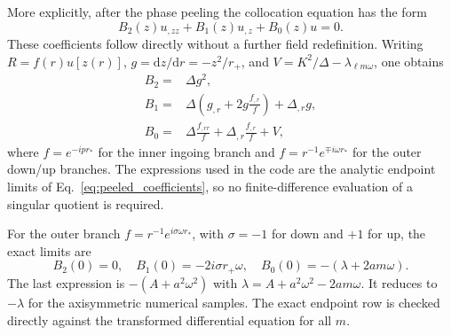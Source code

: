 \documentclass[aps,prd,twocolumn,10pt,nofootinbib,superscriptaddress,floatfix]{revtex4-2}
\newcommand{\dd}{\mathrm{d}}
\begin{document}
More explicitly, after the phase peeling the collocation equation has the
form
\begin{equation}
 B_2(z)u_{,zz}+B_1(z)u_{,z}+B_0(z)u=0 .
\label{eq:peeled_matrix_equation}
\end{equation}
These coefficients follow directly without a further field redefinition.
Writing $R=f(r)u[z(r)]$, $g=\dd z/\dd r=-z^2/r_+$, and
$V=K^2/\Delta-\lambda_{\ell m\omega}$, one obtains
\begin{align}
B_2={}&\Delta g^2,\nonumber\\
B_1={}&\Delta\left(g_{,r}+2g\frac{f_{,r}}{f}\right)
       +\Delta_{,r}g,\nonumber\\
B_0={}&\Delta\frac{f_{,rr}}{f}
       +\Delta_{,r}\frac{f_{,r}}{f}+V,
\label{eq:peeled_coefficients}
\end{align}
where $f=e^{-ipr_*}$ for the inner ingoing branch and
$f=r^{-1}e^{\mp i\omega r_*}$ for the outer down/up branches.  The
expressions used in the code are the analytic endpoint limits of
Eq.~\eqref{eq:peeled_coefficients}, so no finite-difference evaluation of a
singular quotient is required.

For the outer branch $f=r^{-1}e^{i\sigma\omega r_*}$, with
$\sigma=-1$ for down and $+1$ for up, the exact limits are
\begin{equation}
B_2(0)=0,\quad B_1(0)=-2i\sigma r_+\omega,
\quad B_0(0)=-(\lambda+2am\omega).
\label{eq:review-infinity-endpoint}
\end{equation}
The last expression is $-(A+a^2\omega^2)$ with $\lambda=A+a^2\omega^2-2am\omega$.  It reduces to $-\lambda$ for
the axisymmetric numerical samples.  The exact endpoint row is checked
directly against the transformed differential equation for all $m$.
\end{document}
